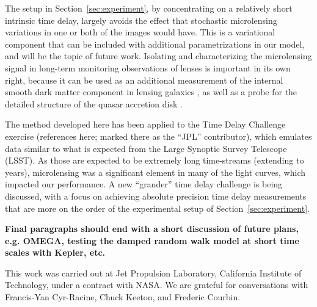 \documentclass{emulateapj}
\begin{document}
The setup in Section~\ref{sec:experiment}, by concentrating on a
relatively short intrinsic time delay, largely avoids the effect that
stochastic microlensing variations in one or both of the images would
have. This is a variational component that can be included with
additional parametrizations in our model, and will be the topic of
future work. Isolating and characterizing the microlensing signal in
long-term monitoring observations of lenses is important in its own
right, because it can be used as an additional measurement of the
internal smooth dark matter component in lensing galaxies
\citep{Schechter2002a}, as well as a probe for the detailed structure
of the quasar accretion disk \citep[e.g.][]{Morgan2010a}.

The method developed here has been applied to the Time Delay Challenge
exercise (references here; marked there as the ``JPL'' contributor),
which emulates data similar to what is expected from the Large
Synoptic Survey Telescope (LSST).  As those are expected to be
extremely long time-streams (extending to years), microlensing was a
significant element in many of the light curves, which impacted our 
performance. A new ``grander'' time delay challenge is being
discussed, with a focus on achieving absolute precision time delay
measurements that are more on the order of the experimental setup of
Section~\ref{sec:experiment}. 

{\bf Final paragraphs should end with a short discussion of future plans, e.g. OMEGA,
testing the damped random walk model at short time scales with Kepler, etc.}

\acknowledgements

This work was carried out at Jet Propulsion Laboratory, California
Institute of Technology, under a contract with NASA.  We are grateful
for conversations with Francis-Yan Cyr-Racine, Chuck Keeton, and
Frederic Courbin. 




\end{document}
